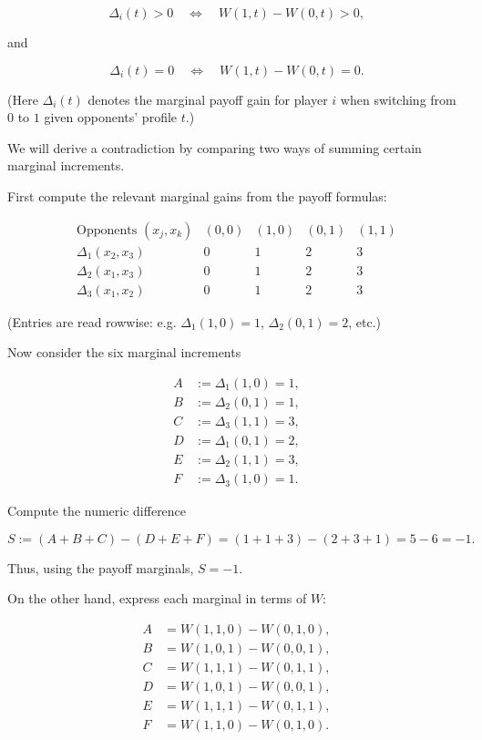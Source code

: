 \documentclass[11pt]{article}
\begin{document}
\[
\Delta_i(t)>0 \quad\Longleftrightarrow\quad W(1,t)-W(0,t)>0,
\]


and


\[
\Delta_i(t)=0 \quad\Longleftrightarrow\quad W(1,t)-W(0,t)=0.
\]


(Here $\Delta_i(t)$ denotes the marginal payoff gain for player $i$ when switching from $0$ to $1$ given opponents' profile $t$.)

We will derive a contradiction by comparing two ways of summing certain marginal increments.

First compute the relevant marginal gains from the payoff formulas:


\[
\begin{array}{c|cccc}
\text{Opponents }(x_j,x_k) & (0,0) & (1,0) & (0,1) & (1,1)\\\hline
\Delta_1(x_2,x_3) & 0 & 1 & 2 & 3\\
\Delta_2(x_1,x_3) & 0 & 1 & 2 & 3\\
\Delta_3(x_1,x_2) & 0 & 1 & 2 & 3
\end{array}
\]


(Entries are read rowwise: e.g. $\Delta_1(1,0)=1$, $\Delta_2(0,1)=2$, etc.)

Now consider the six marginal increments


\[
\begin{aligned}
A &:= \Delta_1(1,0) = 1,\\
B &:= \Delta_2(0,1) = 1,\\
C &:= \Delta_3(1,1) = 3,\\
D &:= \Delta_1(0,1) = 2,\\
E &:= \Delta_2(1,1) = 3,\\
F &:= \Delta_3(1,0) = 1.
\end{aligned}
\]


Compute the numeric difference


\[
S := (A+B+C) - (D+E+F) = (1+1+3) - (2+3+1) = 5-6 = -1.
\]


Thus, using the payoff marginals, \(S=-1\).

On the other hand, express each marginal in terms of \(W\):


\[
\begin{aligned}
A &= W(1,1,0)-W(0,1,0),\\
B &= W(1,0,1)-W(0,0,1),\\
C &= W(1,1,1)-W(0,1,1),\\
D &= W(1,0,1)-W(0,0,1),\\
E &= W(1,1,1)-W(0,1,1),\\
F &= W(1,1,0)-W(0,1,0).
\end{aligned}
\]
\end{document}
